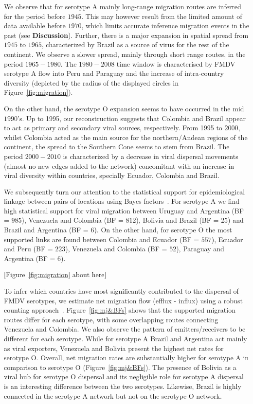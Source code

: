 \documentclass[10pt]{article}
\begin{document}
We observe that for serotype A mainly long-range migration routes are inferred for the period before $1945$.
This may however result from the limited amount of data available before $1970$, which limits accurate inference migration events in the past (see \textbf{Discussion}).
Further, there is a major expansion in spatial spread from $1945$ to $1965$, characterized by Brazil as a source of virus for the rest of the continent.
We observe a slower spread, mainly through short range routes, in the period $1965-1980$.
The $1980-2008$ time window is characterised by FMDV serotype A flow into Peru and Paraguay and the increase of intra-country diversity (depicted by the radius of the displayed circles in Figure~\ref{fig:migration}).   

On the other hand, the serotype O expansion seems to have occurred in the mid $1990$'s.
Up to 1995, our reconstruction suggests that Colombia and Brazil appear to act as primary and secondary viral sources, respectively.
From 1995 to $2000$, whilst Colombia acted as the main source for the northern/Andean regions of the continent, the spread to the Southern Cone seems to stem from Brazil.
The period $2000-2010$ is characterized by a decrease in viral dispersal movements (almost no new edges added to the network) concomitant with an increase in viral diversity within countries, specially Ecuador, Colombia and Brazil.

We subsequently turn our attention to the statistical support for epidemiological linkage between pairs of locations using Bayes factors~\cite{roots}.
For serotype A we find high statistical support for viral migration between Uruguay and Argentina (BF = $985$), Venezuela and Colombia (BF = $812$), Bolivia and Brazil (BF = $25$) and Brazil and Argentina (BF = $6$).
On the other hand, for serotype O the most supported links are found between Colombia and Ecuador (BF = $557$), Ecuador and Peru (BF = $223$), Venezuela and Colombia (BF = $52$), Paraguay and Argentina (BF = $6$). 

\begin{center}
 [Figure~\ref{fig:migration} about here]
\end{center}

To infer which countries have most significantly contributed to the dispersal of FMDV serotypes, we estimate net migration flow (efflux - influx) using a robust counting approach~\cite{Minin2008}.
Figure~\ref{fig:mj&BFs} shows that the supported migration routes differ for each serotype, with some overlapping routes connecting Venezuela and Colombia. 
We also observe the pattern of emitters/receivers to be different for each serotype.
While for serotype A Brazil and Argentina act mainly as viral exporters, Venezuela and Bolivia present the highest net rates for serotype O.
Overall, net migration rates are substantially higher for serotype A in comparison to serotype O (Figure~\ref{fig:mj&BFs}).
The presence of Bolivia as a viral hub for serotype O dispersal and its negligible role for serotype A  dispersal is an interesting difference between the two serotypes. 
Likewise, Brazil is highly connected in the serotype A network but not on the serotype O network.
\end{document}
